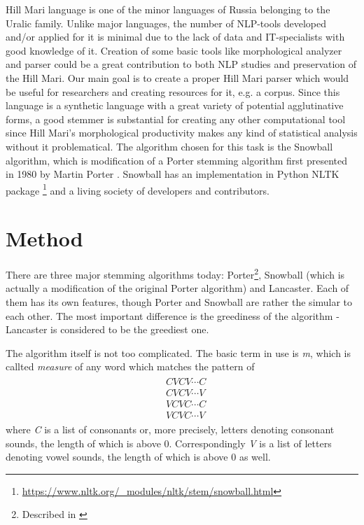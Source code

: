 \documentclass[a4paper,notitlepage]{article}
\begin{document}
Hill Mari language is one of the minor languages of Russia belonging to the Uralic family. Unlike major languages, the number of NLP-tools developed and/or applied for it is minimal due to the lack of data and IT-specialists with good knowledge of it. Creation of some basic tools like morphological analyzer and parser could be a great contribution to both NLP studies and preservation of the Hill Mari. \newline
Our main goal is to create a proper Hill Mari parser which would be useful for researchers and creating resources for it, e.g. a corpus. Since this language is a synthetic language with a great variety of potential agglutinative forms, a good stemmer is substantial for creating any other computational tool since Hill Mari's morphological productivity makes any kind of statistical analysis without it problematical. \newline
The algorithm chosen for this task is the Snowball algorithm, which is modification of a Porter stemming algorithm first presented in 1980 by Martin Porter \citep{porter}. Snowball has an implementation in Python NLTK package \footnote{\url{https://www.nltk.org/_modules/nltk/stem/snowball.html}} and a living society of developers and contributors.

\section{Method}

There are three major stemming algorithms today: Porter\footnote{Described in \citep{porter}}, Snowball (which is actually a modification of the original Porter algorithm) and Lancaster. Each of them has its own features, though Porter and Snowball are rather the simular to each other. The most important difference is the greediness of the algorithm - Lancaster is  considered to be the greediest one. \newline

The algorithm itself is not too complicated. The basic term in use is \textit{m}, which is callted \textit{measure} of any word which matches the pattern of
\begin{align*}
\begin{split}
&CVCV \cdots C \\
&CVCV \cdots V \\
&VCVC \cdots C \\
&VCVC \cdots V
\end{split}
\end{align*} 
where \textit{C} is a list of consonants or, more precisely, letters denoting consonant sounds, the length of which is above 0. Correspondingly \textit{V} is a list of letters denoting vowel sounds, the length of which is above 0 as well. \newline
\end{document}
